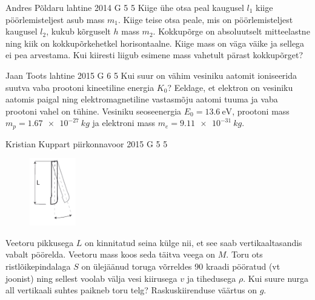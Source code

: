 \documentclass[11pt, twoside]{article}
\begin{document}
{%
{Andres Põldaru} %
{lahtine} %
{2014} %
{G 5} %
{5} %
{
\ifStatement
Kiige ühe otsa peal kaugusel $l_1$ kiige pöörlemisteljest asub mass $m_1$. Kiige teise otsa peale, mis on pöörlemisteljest kaugusel $l_2$, kukub kõrguselt $h$ mass $m_2$. Kokkupõrge on absoluutselt mitteelastne ning kiik on kokkupõrkehetkel horisontaalne. Kiige mass on väga väike ja sellega ei pea arvestama. Kui kiiresti liigub esimene mass vahetult pärast kokkupõrget?
\fi
}

{Jaan Toots} %
{lahtine} %
{2015} %
{G 6} %
{5} %
{
\ifStatement
Kui suur on vähim vesiniku aatomit ioniseerida suutva vaba prootoni kineetiline energia $K_0$? Eeldage, et elektron on vesiniku aatomis paigal ning elektromagnetiline vastasmõju aatomi tuuma ja vaba prootoni vahel on tühine. Vesiniku seoseenergia $E_0 = \SI{13.6}{\electronvolt}$, prootoni mass $m_p=\SI{1.67e-27}{kg}$ ja elektroni mass $m_e=\SI{9.11e-31}{kg}$.
\fi
}

{Kristian Kuppart} %
{piirkonnavoor} %
{2015} %
{G 5} %
{5} %
{
\ifStatement
\begin{figure}
 \vspace{-30pt}
 \begin{center}
 \includegraphics[width=0.18\textwidth]{2015-v2g-05-toru}
 \end{center}
\end{figure}
Veetoru pikkusega $L$ on kinnitatud seina külge nii, et see saab vertikaaltasandis vabalt pöörelda. Veetoru mass koos seda täitva veega on $M$. Toru ots ristlõikepindalaga $S$ on ülejäänud toruga võrreldes \num{90} kraadi pööratud (vt joonist) ning sellest voolab välja vesi kiirusega $v$ ja tihedusega $\rho$. Kui suure nurga all vertikaali suhtes paikneb toru telg? Raskuskiirenduse väärtus on $g$.
\pagebreak
\fi
}

}
\end{document}
